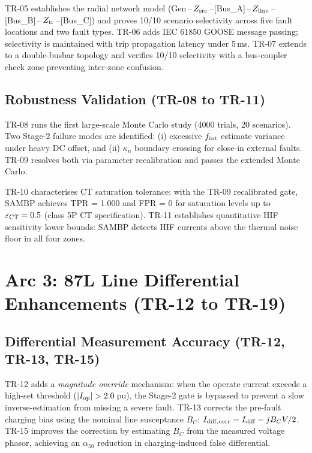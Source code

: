 \documentclass[11pt,a4paper]{article}
\begin{document}
TR-05 establishes the radial network model
(Gen\,--\,$Z_{\rm src}$\,--[Bus\_A]\,--\,$Z_{\rm line}$\,--[Bus\_B]\,--\,$Z_{\rm tr}$\,--[Bus\_C])
and proves 10/10 scenario selectivity across five fault locations and two
fault types.  TR-06 adds IEC 61850 GOOSE message passing; selectivity is
maintained with trip propagation latency under 5\,ms.  TR-07 extends to a
double-busbar topology and verifies 10/10 selectivity with a bus-coupler
check zone preventing inter-zone confusion.

\subsection{Robustness Validation (TR-08 to TR-11)}

TR-08 runs the first large-scale Monte Carlo study (4000 trials, 20 scenarios).
Two Stage-2 failure modes are identified: (i) excessive $f_{\rm int}$ estimate
variance under heavy DC offset, and (ii) $\kappa_n$ boundary crossing for
close-in external faults.  TR-09 resolves both via parameter recalibration
and passes the extended Monte Carlo.

TR-10 characterises CT saturation tolerance: with the TR-09 recalibrated
gate, SAMBP achieves TPR = 1.000 and FPR = 0 for saturation levels up to
$\varepsilon_{\rm CT} = 0.5$ (class 5P CT specification).  TR-11 establishes
quantitative HIF sensitivity lower bounds: SAMBP detects HIF currents above
the thermal noise floor in all four zones.

\section{Arc 3: 87L Line Differential Enhancements (TR-12 to TR-19)}

\subsection{Differential Measurement Accuracy (TR-12, TR-13, TR-15)}

TR-12 adds a \emph{magnitude override} mechanism: when the operate current
exceeds a high-set threshold ($|I_{\rm op}| > 2.0$\,pu), the Stage-2 gate is
bypassed to prevent a slow inverse-estimation from missing a severe fault.
TR-13 corrects the pre-fault charging bias using the nominal line susceptance
$B_C$: $I_{\rm diff,corr} = I_{\rm diff} - jB_C V / 2$.  TR-15 improves the
correction by estimating $B_C$ from the measured voltage phasor, achieving an
$\alpha_{50}$ reduction in charging-induced false differential.
\end{document}
